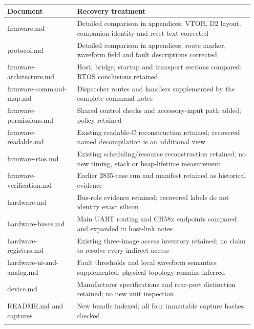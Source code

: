 {\def\LTcaptype{none} %
\begin{longtable}[]{@{}
  >{\raggedright\arraybackslash}p{}
  >{\raggedright\arraybackslash}p{}@{}}
\toprule\noalign{}
\begin{minipage}[b]{\linewidth}\raggedright
Document
\end{minipage} & \begin{minipage}[b]{\linewidth}\raggedright
Recovery treatment
\end{minipage} \\
\midrule\noalign{}
\endhead
\bottomrule\noalign{}
\endlastfoot
firmware.md & Detailed comparison in appendices; VTOR, D2 layout,
companion identity and reset text corrected \\
protocol.md & Detailed comparison in appendices; route marker, waveform
field and fault descriptions corrected \\
firmware-architecture.md & Host, bridge, startup and transport sections
compared; RTOS conclusions retained \\
firmware-command-map.md & Dispatcher routes and handlers supplemented by
the complete command notes \\
firmware-permissions.md & Shared control checks and accessory-input path
added; policy retained \\
firmware-readable.md & Existing readable-C reconstruction retained;
recovered named decompilation is an additional view \\
firmware-rtos.md & Existing scheduling/resource reconstruction retained;
no new timing, stack or heap-lifetime measurement \\
firmware-verification.md & Earlier 2835-case run and manifest retained
as historical evidence \\
hardware.md & Bus-role evidence retained; recovered labels do not
identify exact silicon \\
hardware-buses.md & Main UART routing and CH58x endpoints compared and
expanded in host-link notes \\
hardware-registers.md & Existing three-image access inventory retained;
no claim to resolve every indirect access \\
hardware-ui-and-analog.md & Fault thresholds and local waveform
semantics supplemented; physical topology remains inferred \\
device.md & Manufacturer specifications and rear-port distinction
retained; no new unit inspection \\
README.md and captures & New bundle indexed; all four immutable capture
hashes checked \\*
\end{longtable}
}

